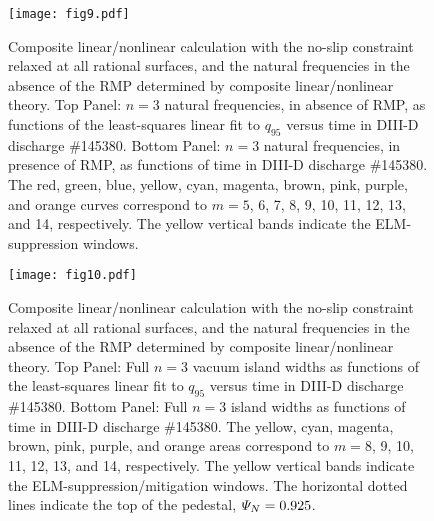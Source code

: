 \documentclass[12pt,prb,aps]{revtex4-1}
\begin{document}
\begin{figure}
\texttt{[image: fig9.pdf]}
\caption{Composite linear/nonlinear calculation with the no-slip constraint relaxed at all rational surfaces, and  the natural frequencies
in the absence of the RMP determined by composite linear/nonlinear theory. Top Panel: $n=3$ natural frequencies, in absence of RMP, as functions of the least-squares linear fit to $q_{95}$ versus time
in   DIII-D discharge \#145380.
Bottom Panel:  $n=3$ natural frequencies, in presence of RMP, as functions of time
in   DIII-D discharge \#145380. The red, green, blue, yellow, cyan, magenta, brown, pink,
purple, and orange  curves correspond to $m=5$, 6, 7, 8, 9, 10, 11, 12, 13, and 14, respectively. The yellow vertical bands indicate the ELM-suppression windows.} \label{fig9}
\end{figure}

\begin{figure}
\texttt{[image: fig10.pdf]}
\caption{Composite linear/nonlinear calculation with the no-slip constraint relaxed at all rational surfaces, and  the natural frequencies
in the absence of the RMP determined by composite linear/nonlinear theory. Top Panel: Full  $n=3$ vacuum island widths as functions of the least-squares linear fit to $q_{95}$ versus time 
in   DIII-D discharge \#145380.
Bottom Panel:  Full $n=3$ island widths as functions of time
in   DIII-D discharge \#145380. The yellow, cyan, magenta, brown, pink,
purple, and orange  areas correspond to $m=8$, 9, 10, 11, 12, 13, and 14, respectively. The yellow vertical bands indicate the ELM-suppression/mitigation windows. 
The horizontal dotted lines indicate the top of the pedestal, ${\mit\Psi}_N=0.925$.} \label{fig10}
\end{figure}
\end{document}
